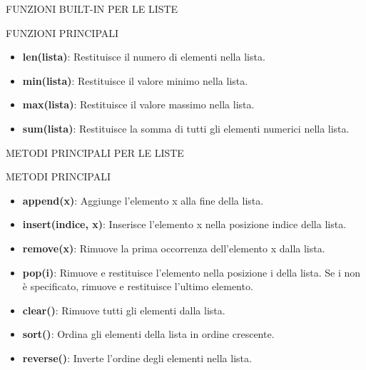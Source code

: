 \documentclass[aspectratio=1610]{beamer}
\begin{document}
\begin{frame}{FUNZIONI BUILT-IN PER LE LISTE}
    \begin{alertblock}{FUNZIONI PRINCIPALI}
        \begin{minipage}{0.98\linewidth}
            \justifying
            \begin{itemize}
                \item \textbf{len(lista)}: Restituisce il numero di elementi nella lista.
                \pause
                \item \textbf{min(lista)}: Restituisce il valore minimo nella lista.
                \pause
                \item \textbf{max(lista)}: Restituisce il valore massimo nella lista.
                \pause
                \item \textbf{sum(lista)}: Restituisce la somma di tutti gli elementi numerici nella lista.
            \end{itemize}
        \end{minipage}
    \end{alertblock}
\end{frame}

\begin{frame}{METODI PRINCIPALI PER LE LISTE}
    \begin{alertblock}{METODI PRINCIPALI}
        \begin{minipage}{0.98\linewidth}
            \justifying
            \begin{itemize}
                \item \textbf{append(x)}: Aggiunge l'elemento x alla fine della lista.
                \pause
                \item \textbf{insert(indice, x)}: Inserisce l'elemento x nella posizione indice della lista.
                \pause
                \item \textbf{remove(x)}: Rimuove la prima occorrenza dell'elemento x dalla lista.
                \pause
                \item \textbf{pop(i)}: Rimuove e restituisce l'elemento nella posizione i della lista. Se i non è specificato, rimuove e restituisce l'ultimo elemento.
                \pause
                \item \textbf{clear()}: Rimuove tutti gli elementi dalla lista.
                \pause
                \item \textbf{sort()}: Ordina gli elementi della lista in ordine crescente.
                \pause
                \item \textbf{reverse()}: Inverte l'ordine degli elementi nella lista.
            \end{itemize}
        \end{minipage}
    \end{alertblock}
\end{frame}
\end{document}
